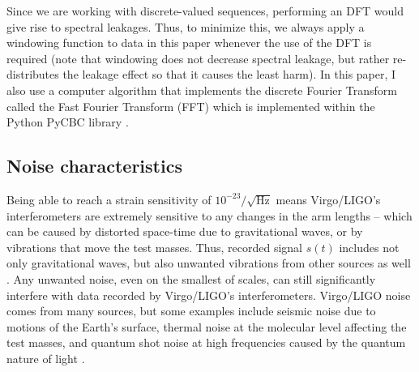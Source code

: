 \documentclass[reprint,
letterpaper,
 amsmath,amssymb,
 aps,
]{revtex4-2}
\begin{document}
Since we are working with discrete-valued sequences, performing an DFT would give rise to spectral leakages. Thus, to minimize this, we always apply a windowing function to data in this paper whenever the use of the DFT is required (note that windowing does not decrease spectral leakage, but rather re-distributes the leakage effect so that it causes the least harm). In this paper, I also use a computer algorithm that implements the discrete Fourier Transform called the Fast Fourier Transform (FFT) which is implemented within the Python PyCBC library \cite{numpy}.

\subsection{Noise characteristics}
Being able to reach a strain sensitivity of $10^{-23}/\sqrt{\text{Hz}}$ \cite{sensitivity} means Virgo/LIGO's interferometers are extremely sensitive to any changes in the arm lengths – which can be caused by distorted space-time due to gravitational waves, or by vibrations that move the test masses. Thus, recorded signal $s(t)$ includes not only gravitational waves, but also unwanted vibrations from other sources as well \cite{ultimate}. Any unwanted noise, even on the smallest of scales, can still significantly interfere with data recorded by Virgo/LIGO's interferometers. Virgo/LIGO noise comes from many sources, but some examples include seismic noise due to motions of the Earth's surface, thermal noise at the molecular level affecting the test masses, and quantum shot noise at high frequencies caused by the quantum nature of light \cite{blair_howell_ju_zhao_2012}.
\end{document}
